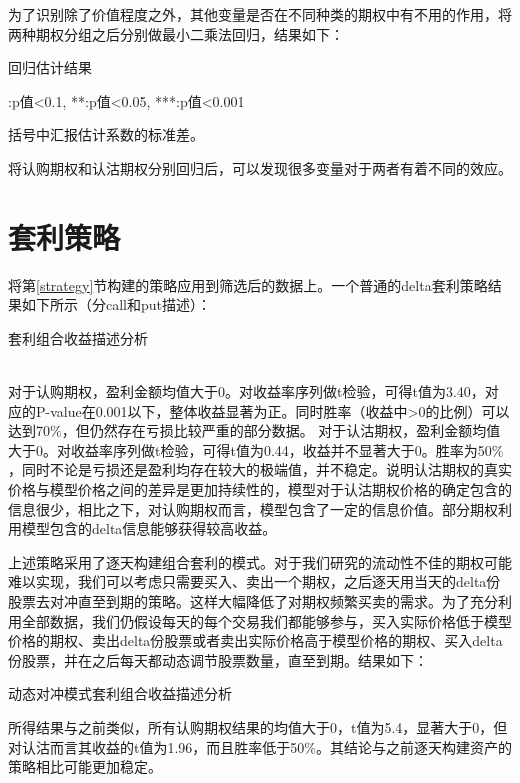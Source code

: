 \par{为了识别除了价值程度之外，其他变量是否在不同种类的期权中有不用的作用，将两种期权分组之后分别做最小二乘法回归，结果如下：}
\newpage
{}
\begin{center}
    \begin{threeparttable}[H]

        \caption{回归估计结果}

        
        \begin{tablenotes}
            \footnotesize
            \item *:p值<0.1, **:p值<0.05, ***:p值<0.001
            \item 括号中汇报估计系数的标准差。
        \end{tablenotes}
    \end{threeparttable}
\end{center}
\newpage
\restoregeometry
将认购期权和认沽期权分别回归后，可以发现很多变量对于两者有着不同的效应。
\section{套利策略}
将第\ref{strategy}节构建的策略应用到筛选后的数据上。一个普通的delta套利策略结果如下所示（分call和put描述）： 
~\\
\begin{table}
    \caption{套利组合收益描述分析}
    \centering
    
    
\end{table}

~\\ 
对于认购期权，盈利金额均值大于0。对收益率序列做t检验，可得t值为3.40，对应的P-value在0.001以下，整体收益显著为正。同时胜率（收益中>0的比例）可以达到70$\%$，但仍然存在亏损比较严重的部分数据。
对于认沽期权，盈利金额均值大于0。对收益率序列做t检验，可得t值为0.44，收益并不显著大于0。胜率为50$\%$，同时不论是亏损还是盈利均存在较大的极端值，并不稳定。说明认沽期权的真实价格与模型价格之间的差异是更加持续性的，模型对于认沽期权价格的确定包含的信息很少，相比之下，对认购期权而言，模型包含了一定的信息价值。部分期权利用模型包含的delta信息能够获得较高收益。
\par{上述策略采用了逐天构建组合套利的模式。对于我们研究的流动性不佳的期权可能难以实现，我们可以考虑只需要买入、卖出一个期权，之后逐天用当天的delta份股票去对冲直至到期的策略。这样大幅降低了对期权频繁买卖的需求。为了充分利用全部数据，我们仍假设每天的每个交易我们都能够参与，买入实际价格低于模型价格的期权、卖出delta份股票或者卖出实际价格高于模型价格的期权、买入delta份股票，并在之后每天都动态调节股票数量，直至到期。结果如下：
}
\begin{table}[H]
    \caption{动态对冲模式套利组合收益描述分析}
    \centering
    

\end{table}
所得结果与之前类似，所有认购期权结果的均值大于0，t值为5.4，显著大于0，但对认沽而言其收益的t值为1.96，而且胜率低于50$\%$。其结论与之前逐天构建资产的策略相比可能更加稳定。
